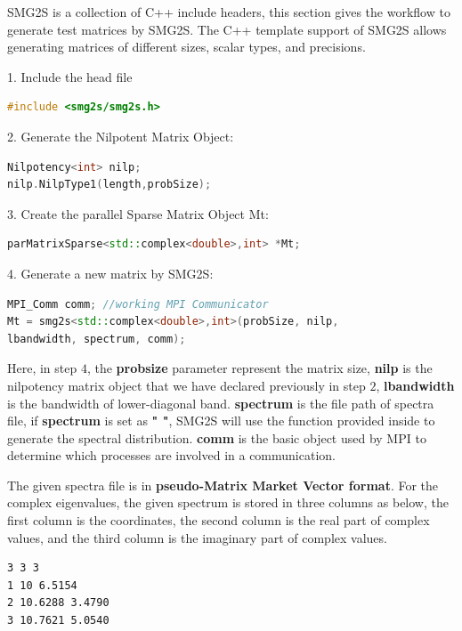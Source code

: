 SMG2S is a collection of C++ include headers, this section gives the workflow to generate test matrices by SMG2S. The C++ template support of SMG2S allows generating matrices of different sizes, scalar types, and precisions.


1. Include the head file

\begin{lstlisting}[language=C++,frame=single]
#include <smg2s/smg2s.h>
\end{lstlisting}

2. Generate the Nilpotent Matrix Object:

\begin{lstlisting}[language=C++,frame=single]
Nilpotency<int> nilp;
nilp.NilpType1(length,probSize);
\end{lstlisting}

3. Create the parallel Sparse Matrix Object Mt:

\begin{lstlisting}[language=C++,frame=single]
parMatrixSparse<std::complex<double>,int> *Mt;
\end{lstlisting}

4. Generate a new matrix by SMG2S:

\begin{lstlisting}[language=C++,frame=single]
MPI_Comm comm; //working MPI Communicator
Mt = smg2s<std::complex<double>,int>(probSize, nilp, 
lbandwidth, spectrum, comm);
\end{lstlisting}


Here, in step $4$, the \textbf{probsize} parameter represent the matrix size, \textbf{nilp} is the nilpotency matrix object that we have declared previously in step $2$, \textbf{lbandwidth} is the bandwidth of lower-diagonal band. \textbf{spectrum} is the file path of spectra file, if \textbf{spectrum} is set as \textbf{" "}, SMG2S will use the function provided inside to generate the spectral distribution. \textbf{comm} is the basic object used by MPI to determine which processes are involved in a communication.

The given spectra file is in \textbf{pseudo-Matrix Market Vector format}. For the complex eigenvalues, the given spectrum is stored in three columns as below, the first column is the coordinates, the second column is the real part of complex values, and the third column is the imaginary part of complex values.

\begin{lstlisting}[language=bash,frame=single]
%%MatrixMarket matrix coordinate complex general
3 3 3
1 10 6.5154
2 10.6288 3.4790
3 10.7621 5.0540
\end{lstlisting}

